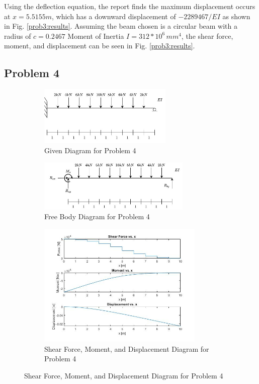 \documentclass[a4paper]{article}
\begin{document}
Using the deflection equation, the report finds the maximum displacement occurs at $x = 5.5155 m$, which has a downward displacement of $-2289467/EI$ as shown in Fig. \ref{prob3:results}. Assuming the beam chosen is a circular beam with a radius of $c=0.2467$ Moment of Inertia $I=312 * 10^6\,{mm}^4$, the shear force, moment, and displacement can be seen in Fig. \ref{prob3:results}.


\subsection{Problem 4}
\begin{figure}[H]
\centering
   \begin{subfigure}[b]{\textwidth}
   \centering
   \includegraphics[width=0.7\textwidth]{problems/prob_4.jpg}
   \caption{Given Diagram for Problem 4}
   \label{prob4:prob} 
\end{subfigure}
\begin{subfigure}[b]{\textwidth}
   \centering   
   \includegraphics[width=0.8\textwidth]{FBD/FBD_4.jpg}
   \caption{Free Body Diagram for Problem 4}
   \label{prob4:FBD}
\end{subfigure}
\begin{subfigure}[b]{\textwidth}
   \centering   
   \includegraphics[width=0.87\textwidth]{results/solution_4.jpg}
   \caption{Shear Force, Moment, and Displacement Diagram for Problem 4}
   \label{prob4:results}
\end{subfigure}
\label{prob4}
\end{figure}
\end{document}
